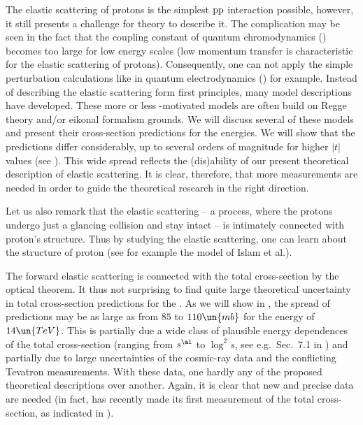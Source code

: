 \def\CaptionPrefix{I.}


The elastic scattering of protons is the simplest $\rm pp$ interaction possible, however, it still presents a challenge for theory to describe it. The complication may be seen in the fact that the coupling constant of quantum chromodynamics () becomes too large for low energy scales (low momentum transfer is characteristic for the elastic scattering of protons). Consequently, one can not apply the simple perturbation calculations like in quantum electrodynamics () for example. Instead of describing the elastic scattering form first principles, many model descriptions have developed. These more or less -motivated models are often build on Regge theory and/or eikonal formalism grounds. We will discuss several of these models and present their  cross-section predictions for the  energies. We will show that the predictions differ considerably, up to several orders of magnitude for higher $|t|$ values (see ). This wide spread reflects the (dis)ability of our present theoretical description of elastic scattering. It is clear, therefore, that more measurements are needed in order to guide the theoretical research in the right direction.

Let us also remark that the elastic scattering -- a process, where the protons undergo just a glancing collision and stay intact -- is intimately connected with proton's structure. Thus by studying the elastic scattering, one can learn about the structure of proton (see for example the model of Islam et al.).

The forward elastic scattering is connected with the total cross-section by the optical theorem. It thus not surprising to find quite large theoretical uncertainty in total cross-section predictions for the . As we will show in , the spread of predictions may be as large as from $85$ to $110\un{mb}$ for the energy of $14\un{TeV}$. This is partially due a wide class of plausible energy dependences of the total cross-section (ranging from $s^{\al}$ to $\log^2 s$, see e.g.~Sec.~7.1 in ) and partially due to large uncertainties of the cosmic-ray data and the conflicting Tevatron measurements. With these data, one hardly any of the proposed theoretical descriptions over another. Again, it is clear that new and precise data are needed (in fact,  has recently made its first measurement of the total cross-section, as indicated in ).

